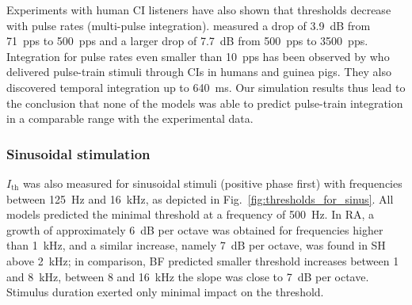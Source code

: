 \documentclass[utf8]{frontiersSCNS} %
\newcommand{\T}[1]{\text{#1}}
\begin{document}
Experiments with human CI listeners have also shown that thresholds decrease with pulse rates (multi-pulse integration). \cite{Carlyon2015} measured a drop of \SI{3.9}{dB} from \SI{71}{pps} to \SI{500}{pps} and a larger drop of \SI{7.7}{dB} from \SI{500}{pps} to \SI{3500}{pps}. %
Integration for pulse rates even smaller than \SI{10}{pps} has been observed by \citep{Zhou2015} who delivered pulse-train stimuli through CIs in humans and guinea pigs. They also discovered temporal integration up to \SI{640}{\milli\second}.
Our simulation results thus lead to the conclusion that none of the models was able to predict pulse-train integration in a comparable range with the experimental data.

\subsubsection{Sinusoidal stimulation}
\label{subsubsec:sinusoidal_stimulation}
$I_{\T{th}}$ was also measured for sinusoidal stimuli (positive phase first) with frequencies between \SI{125}{\hertz} and \SI{16}{\kilo\hertz}, as depicted in Fig.\ \ref{fig:thresholds_for_sinus}. All models predicted the minimal threshold at a frequency of \SI{500}{\hertz}. In RA, a growth of approximately \SI{6}{dB} per octave was obtained for frequencies higher than \SI{1}{\kilo\hertz}, and a similar increase, namely \SI{7}{dB} per octave, was found in SH above \SI{2}{\kilo\hertz}; in comparison, BF predicted smaller threshold increases between 1 and \SI{8}{\kilo\hertz}, between 8 and \SI{16}{\kilo\hertz} the slope was close to \SI{7}{dB} per octave. Stimulus duration exerted only minimal impact on the threshold.
\end{document}
